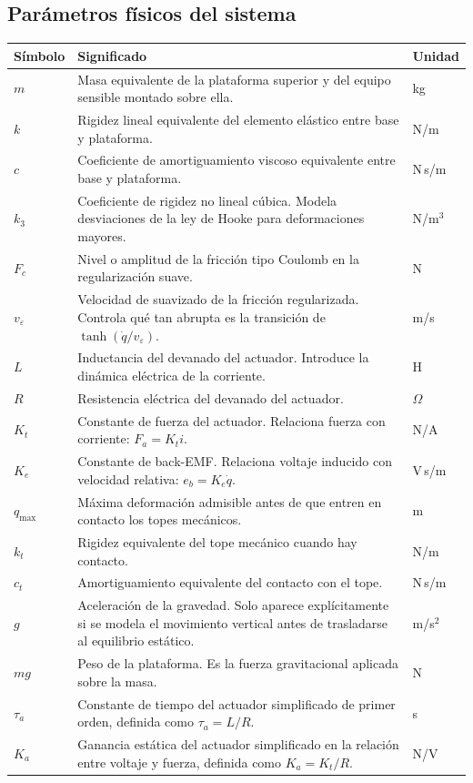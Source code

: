 \documentclass[11pt]{article}
\begin{document}
\subsection{Par\'ametros f\'isicos del sistema}

\begin{center}
\small
\begin{tabular}{>{\raggedright\arraybackslash}p{3.0cm} >{\raggedright\arraybackslash}p{9.0cm} >{\raggedright\arraybackslash}p{2.2cm}}
\toprule
\textbf{S\'imbolo} & \textbf{Significado} & \textbf{Unidad} \\
\midrule
$m$ & Masa equivalente de la plataforma superior y del equipo sensible montado sobre ella. & kg \\
$k$ & Rigidez lineal equivalente del elemento el\'astico entre base y plataforma. & N/m \\
$c$ & Coeficiente de amortiguamiento viscoso equivalente entre base y plataforma. & N\,s/m \\
$k_3$ & Coeficiente de rigidez no lineal c\'ubica. Modela desviaciones de la ley de Hooke para deformaciones mayores. & N/m$^3$ \\
$F_c$ & Nivel o amplitud de la fricci\'on tipo Coulomb en la regularizaci\'on suave. & N \\
$v_\varepsilon$ & Velocidad de suavizado de la fricci\'on regularizada. Controla qu\'e tan abrupta es la transici\'on de $\tanh(\dot q/v_\varepsilon)$. & m/s \\
$L$ & Inductancia del devanado del actuador. Introduce la din\'amica el\'ectrica de la corriente. & H \\
$R$ & Resistencia el\'ectrica del devanado del actuador. & $\Omega$ \\
$K_t$ & Constante de fuerza del actuador. Relaciona fuerza con corriente: $F_a=K_t i$. & N/A \\
$K_e$ & Constante de back-EMF. Relaciona voltaje inducido con velocidad relativa: $e_b=K_e\dot q$. & V\,s/m \\
$q_{\max}$ & M\'axima deformaci\'on admisible antes de que entren en contacto los topes mec\'anicos. & m \\
$k_t$ & Rigidez equivalente del tope mec\'anico cuando hay contacto. & N/m \\
$c_t$ & Amortiguamiento equivalente del contacto con el tope. & N\,s/m \\
$g$ & Aceleraci\'on de la gravedad. Solo aparece expl\'icitamente si se modela el movimiento vertical antes de trasladarse al equilibrio est\'atico. & m/s$^2$ \\
$mg$ & Peso de la plataforma. Es la fuerza gravitacional aplicada sobre la masa. & N \\
$\tau_a$ & Constante de tiempo del actuador simplificado de primer orden, definida como $\tau_a=L/R$. & s \\
$K_a$ & Ganancia est\'atica del actuador simplificado en la relaci\'on entre voltaje y fuerza, definida como $K_a=K_t/R$. & N/V \\
\bottomrule
\end{tabular}
\end{center}
\end{document}
